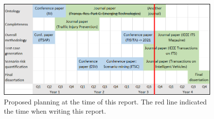 \documentclass[10pt,final,a4paper,oneside,onecolumn]{article}
\begin{document}
\begin{figure}
	\centering
	\includegraphics[width=\linewidth]{planning.png}
	\caption{Proposed planning at the time of this report. The red line indicated the time when writing this report.}
	\label{fig:planning}
\end{figure}


\printbibliography

%
\end{document}
